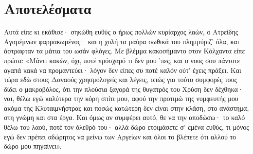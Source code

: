 \documentclass[12pt,a4paper]{article}
\begin{document}
\section{Αποτελέσματα}\label{sec:res}

Αυτά είπε κι εκάθισε· σηκώθη ευθύς ο ήρως
πολλών κυρίαρχος λαών, ο Ατρείδης Αγαμέμνων
φαρμακωμένος· και η χολή τα μαύρα σωθικά του
πλημμύριζ' όλα, και άστραφταν τα μάτια του ωσάν φλόγες.
Με βλέμμα κακοσήμαντο στον Κάλχαντα είπε πρώτα:
«Μάντι κακών, όχι, ποτέ πρόσχαρό τι δεν μου 'πες,
και ο νους σου πάντοτε αγαπά κακά να προμαντεύει·
λόγον δεν είπες συ ποτέ καλόν ούτ' έχεις πράξει.
Και τώρα εδώ στους Δαναούς χρησμολογείς και λέγεις,
οπώς για τούτο συμφορές τους δίδει ο μακροβόλος,
ότι την πλούσια ξαγορά της θυγατρός του Χρύση
δεν δέχθηκα· ναι, θέλω εγώ καλύτερα την κόρη
σπίτι μου, αφού την προτιμώ της νυμφευτής μου ακόμα
της Κλυταιμνήστρας και ποσώς κατώτερη δεν είναι
στην κλάση, στο ανάστημα, στη γνώμη και στα έργα.
Και όμως αν συμφέρει αυτό, θε να την αποδώσω·
το καλό θέλω του λαού, ποτέ τον όλεθρό του·
αλλά δώρο ετοιμάσετε σ' εμένα ευθύς, τι μόνος
εγώ δεν πρέπει αδώρητος να μείνω των Αργείων
και όλοι το βλέπετε ότι αλλού το δώρο μου πηγαίνει».




\end{document}
